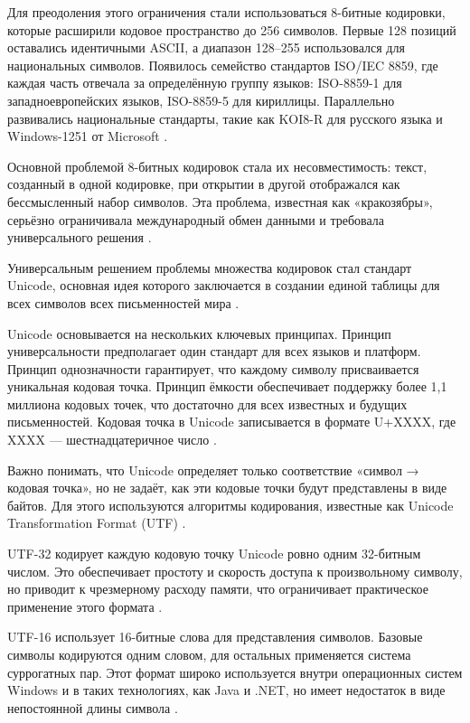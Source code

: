 \documentclass{SibFU-docs}
\begin{document}
Для преодоления этого ограничения стали использоваться 8-битные кодировки, которые расширили кодовое пространство до 256 символов. Первые 128 позиций оставались идентичными ASCII, а диапазон 128–255 использовался для национальных символов. Появилось семейство стандартов ISO/IEC 8859, где каждая часть отвечала за определённую группу языков: ISO-8859-1 для западноевропейских языков, ISO-8859-5 для кириллицы. Параллельно развивались национальные стандарты, такие как KOI8-R для русского языка и Windows-1251 от Microsoft \cite{iana2024}.

Основной проблемой 8-битных кодировок стала их несовместимость: текст, созданный в одной кодировке, при открытии в другой отображался как бессмысленный набор символов. Эта проблема, известная как «кракозябры», серьёзно ограничивала международный обмен данными и требовала универсального решения \cite{iso10646}.


Универсальным решением проблемы множества кодировок стал стандарт Unicode, основная идея которого заключается в создании единой таблицы для всех символов всех письменностей мира \cite{unicode2024}.

Unicode основывается на нескольких ключевых принципах. Принцип универсальности предполагает один стандарт для всех языков и платформ. Принцип однозначности гарантирует, что каждому символу присваивается уникальная кодовая точка. Принцип ёмкости обеспечивает поддержку более 1,1 миллиона кодовых точек, что достаточно для всех известных и будущих письменностей. Кодовая точка в Unicode записывается в формате U+XXXX, где XXXX — шестнадцатеричное число \cite{unicode1996}.

Важно понимать, что Unicode определяет только соответствие «символ → кодовая точка», но не задаёт, как эти кодовые точки будут представлены в виде байтов. Для этого используются алгоритмы кодирования, известные как Unicode Transformation Format (UTF) \cite{rfc3629}.

UTF-32 кодирует каждую кодовую точку Unicode ровно одним 32-битным числом. Это обеспечивает простоту и скорость доступа к произвольному символу, но приводит к чрезмерному расходу памяти, что ограничивает практическое применение этого формата \cite{w3c2024}.

UTF-16 использует 16-битные слова для представления символов. Базовые символы кодируются одним словом, для остальных применяется система суррогатных пар. Этот формат широко используется внутри операционных систем Windows и в таких технологиях, как Java и .NET, но имеет недостаток в виде непостоянной длины символа \cite{tanenbaum2015}.
\end{document}
